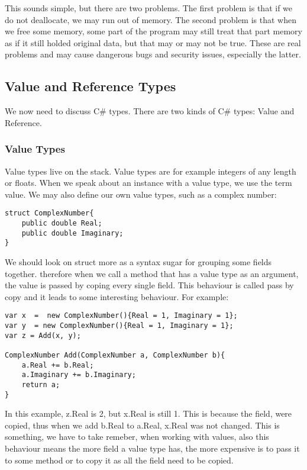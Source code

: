 This sounds simple, but there are two problems. The first problem is that if we do not deallocate, we may run out of memory. The second problem is that when we free some memory, some part of the program may still treat that part memory as if it still holded original data, but that may or may not be true. These are real problems and may cause dangerous bugs and security issues, especially the latter.

\subsection{Value and Reference Types}

We now need to discuss C\# types. There are two kinds of C\# types: Value and Reference.

\subsubsection{Value Types}

Value types live on the stack. Value types are for example integers of any length or floats. When we speak about an instance with a value type, we use the term value. We may also define our own value types, such as a complex number:

\begin{lstlisting}
struct ComplexNumber{
    public double Real;
    public double Imaginary;
}
\end{lstlisting}
We should look on struct more as a syntax sugar for grouping some fields together. therefore when we call a method that has a value type as an argument, the value is passed by coping every single field. This behaviour is called pass by copy and it leads to some interesting behaviour. For example:

\begin{lstlisting}
var x  =  new ComplexNumber(){Real = 1, Imaginary = 1};
var y  = new ComplexNumber(){Real = 1, Imaginary = 1};
var z = Add(x, y);

ComplexNumber Add(ComplexNumber a, ComplexNumber b){
    a.Real += b.Real;
    a.Imaginary += b.Imaginary;
    return a;
}
\end{lstlisting}

In this example, z.Real is 2, but x.Real is still 1. This is because the field, were copied, thus when we add b.Real to a.Real, x.Real was not changed.
This is something, we have to take remeber, when working with values, also this behaviour means the more field a value type has, the more expensive is to pass it to some method or to copy it as all the field need to be copied.

